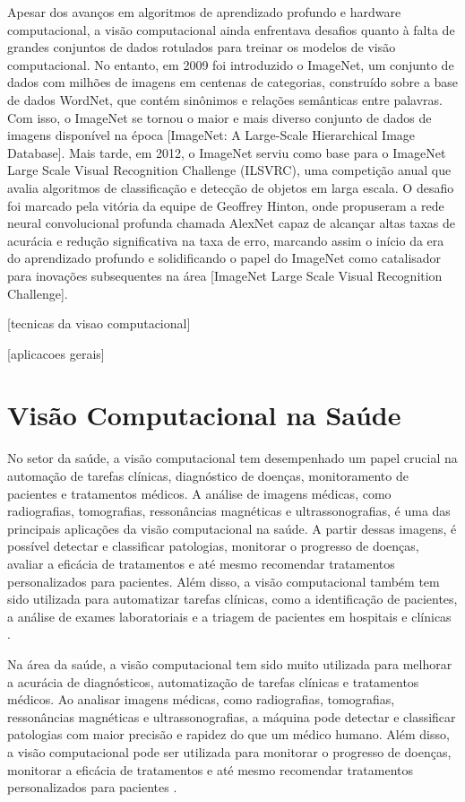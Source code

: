 Apesar dos avanços em algoritmos de aprendizado profundo e hardware computacional, a visão computacional ainda enfrentava desafios quanto à falta de grandes conjuntos de dados rotulados para treinar os modelos de visão computacional. No entanto, em 2009 foi introduzido o ImageNet, um conjunto de dados com milhões de imagens em centenas de categorias, construído sobre a base de dados WordNet, que contém sinônimos e relações semânticas entre palavras. Com isso, o ImageNet se tornou o maior e mais diverso conjunto de dados de imagens disponível na época [ImageNet: A Large-Scale Hierarchical Image Database]. Mais tarde, em 2012, o ImageNet serviu como base para o ImageNet Large Scale Visual Recognition Challenge (ILSVRC), uma competição anual que avalia algoritmos de classificação e detecção de objetos em larga escala. O desafio foi marcado pela vitória da equipe de Geoffrey Hinton, onde propuseram a rede neural convolucional profunda chamada AlexNet capaz de alcançar altas taxas de acurácia e redução significativa na taxa de erro, marcando assim o início da era do aprendizado profundo e solidificando o papel do ImageNet como catalisador para inovações subsequentes na área [ImageNet Large Scale Visual Recognition Challenge].

[tecnicas da visao computacional]

[aplicacoes gerais]

\section{Visão Computacional na Saúde}\label{sec:visao-computacional-saude}

No setor da saúde, a visão computacional tem desempenhado um papel crucial na automação de tarefas clínicas, diagnóstico de doenças, monitoramento de pacientes e tratamentos médicos. A análise de imagens médicas, como radiografias, tomografias, ressonâncias magnéticas e ultrassonografias, é uma das principais aplicações da visão computacional na saúde. A partir dessas imagens, é possível detectar e classificar patologias, monitorar o progresso de doenças, avaliar a eficácia de tratamentos e até mesmo recomendar tratamentos personalizados para pacientes. Além disso, a visão computacional também tem sido utilizada para automatizar tarefas clínicas, como a identificação de pacientes, a análise de exames laboratoriais e a triagem de pacientes em hospitais e clínicas \cite{JAVAID2024792}.

Na área da saúde, a visão computacional tem sido muito utilizada para melhorar a acurácia de diagnósticos, automatização de tarefas clínicas e tratamentos médicos. Ao analisar imagens médicas, como radiografias, tomografias, ressonâncias magnéticas e ultrassonografias, a máquina pode detectar e classificar patologias com maior precisão e rapidez do que um médico humano. Além disso, a visão computacional pode ser utilizada para monitorar o progresso de doenças, monitorar a eficácia de tratamentos e até mesmo recomendar tratamentos personalizados para pacientes \cite{JAVAID2024792}.

